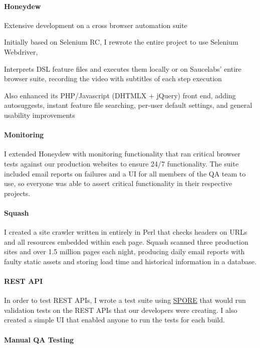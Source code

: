 \begin{position}
  \paragraph{Honeydew}
  \begin{myitem}
    \item Extensive development on a cross browser automation suite
      \begin{myitem}
      \item Initially based on Selenium RC, I rewrote the entire
        project to use Selenium Webdriver,
      \end{myitem}
    \item Interprets DSL feature files and executes them locally or on
      Saucelabs' entire browser suite, recording the video with
      subtitles of each step execution
    \item Also enhanced its PHP/Javascript (DHTMLX + jQuery) front
      end, adding autosuggests, instant feature file searching,
      per-user default settings, and general usability improvements
  \end{myitem}

  \paragraph{Monitoring}
  I extended Honeydew with monitoring functionality that ran critical
  browser tests against our production websites to ensure 24/7
  functionality. The suite included email reports on failures and a UI
  for all members of the QA team to use, so everyone was able to
  assert critical functionality in their respective projects.
  \paragraph{Squash}
  I created a site crawler written in entirely in Perl that checks
  headers on URLs and all resources embedded within each page. Squash
  scanned three production sites and over 1.5 million pages each
  night, producing daily email reports with faulty static assets and
  storing load time and historical information in a database.
  \paragraph{REST API}
  In order to test REST APIs, I wrote a test suite using
  \href{https://github.com/SPORE}{SPORE} that would run validation
  tests on the REST APIs that our developers were creating. I also
  created a simple UI that enabled anyone to run the tests for each
  build.
  \paragraph{Manual QA Testing}
\end{position}

